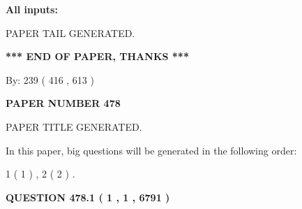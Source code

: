 \documentclass{ctexart}
\begin{document}
   
   
   
\noindent{}
   
   
   
   
\noindent\vspace{0.1in}\hspace{-0.08in} {\textbf{\Large{All inputs: }}}
   
   
   
   
   
   
 \vspace{0.2in}
 
   
   
\vspace{2.0in} PAPER TAIL GENERATED.
   
   
   
   
\vspace{1.0in} 
{\textbf{\large{ *** END OF PAPER, THANKS *** }}} 
   
   
\hspace{1.0in} By: 
 239 ( 416 ,  613 )
   
   
   
   
\newpage 
\setcounter{page}{ 
   478001 } 
   
   
   
   
 {\textbf{ \Large{ PAPER NUMBER  478  }}}
   
   
\vspace{0.2in}
   
   
   
   
   
   
   
   
 \vspace{0.2in}
 
 
 
 
   
   
 PAPER TITLE GENERATED.
   
   
   
\vspace{0.2in}
   
In this paper, big questions will be generated in the following order: 
   
   
   1 ( 1 )
 ,
   2 ( 2 )
 .
  
\vspace{0.2in}
  
{\textbf{\Large{QUESTION
478.1 
 ( 1 , 1 , 6791 )
}}}
  
\end{document}
